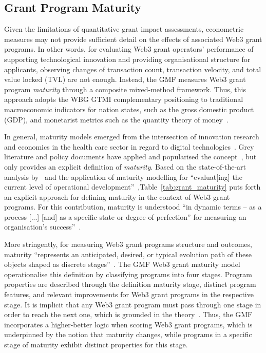 \documentclass[conference]{IEEEtran}
\begin{document}
\subsection{Grant Program Maturity}\label{sec_2.2}

Given the limitations of quantitative grant impact assessments, econometric measures may not provide sufficient detail on the effects of associated Web3 grant programs. In other words, for evaluating Web3 grant operators' performance of supporting technological innovation and providing organisational structure for applicants, observing changes of transaction count, transaction velocity, and total value locked (TVL) are not enough. Instead, the GMF measures Web3 grant program \textit{maturity} through a composite mixed-method framework. Thus, this approach adopts the WBG GTMI complementary positioning to traditional macroeconomic indicators for nation states, such as the gross domestic product (GDP), and monetarist metrics such as the quantity theory of money~\cite{sun_understanding_2004}.

In general, maturity models emerged from the intersection of innovation research and economics in the health care sector in regard to digital technologies~\cite{van_ede_assembling_2024,knosp_research_2018}. Grey literature and policy documents have applied and popularised the concept~\cite[see also]{dener_govtech_2021,queensland_audit_office_risk_2023}, but only \cite{kucinska-landwojtowicz_organizational_2023} provides an explicit definition of \textit{maturity}. Based on the state-of-the-art analysis by~\cite{kucinska-landwojtowicz_organizational_2023} and the application of maturity modelling for ``evaluat[ing] the current level of operational development''~\cite{yatskovskaya_integrated_2018},Table~\ref{tab:grant_maturity} puts forth an explicit approach for defining maturity in the context of Web3 grant programs. For this contribution, maturity is understood ``in dynamic terms – as a process [...] [and] as a specific state or degree of perfection'' for measuring an organisation's success''~\cite[p.~62]{kucinska-landwojtowicz_organizational_2023}.

More stringently, for measuring Web3 grant programs structure and outcomes, maturity ``represents an anticipated, desired, or typical evolution path of these objects shaped as discrete stages''~\cite[p.~213]{becker_developing_2009}. The GMF Web3 grant maturity model operationalise this definition by classifying programs into four stages. Program properties are described through the definition maturity stage, distinct program features, and relevant improvements for Web3 grant programs in the respective stage. It is implicit that any Web3 grant program must pass through one stage in order to reach the next one, which is grounded in the theory~\cite{yatskovskaya_integrated_2018}. Thus, the GMF incorporates a higher-better logic when scoring Web3 grant programs, which is underpinned by the notion that maturity changes, while programs in a specific stage of maturity exhibit distinct properties for this stage.
\end{document}
